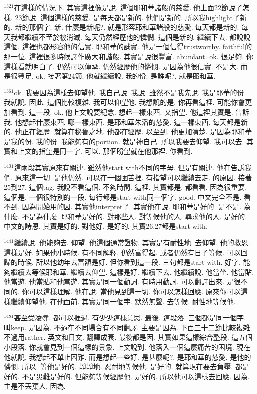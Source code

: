 \documentclass{book}
\begin{document}
$^{1321}$在這樣的情況下.
其實這裡像是說.
這個耶和華諸般的慈愛.
他上面22節說了怎樣.
23節說.
這個這樣的慈愛.
是每天都是新的.
他們是新的.
所以我highlight了新的.
新的那個字.
新.
什麼是新呢?.
就是形容耶和華諸般的慈愛.
每天都是新的.
每天我都繼續不至於被消滅.
每天仍然經歷他的憐憫.
這個是新的.
繼續下去.
都說說這個.
這裡也都形容他的信實.
耶和華的誠實.
他是一個信得trustworthy.
faithful的那一位.
這裡很多時候譯作廣大和諧般.
其實是說很豐富.
abundant.
ok.
很足夠.
你這樣看就明白了.
仍然可以傳承.
仍然經歷他的憐憫.
是因為他很信實.
不是大.
而是很豐足.
ok.
接著第24節.
他就繼續說.
我的份.
是誰呢?.
就是耶和華.

$^{1361}$ok.
我要因為這樣去仰望他.
我自己說.
我說.
雖然不是我先說.
我是耶華的份.
我就說.
因此.
這個比較複雜.
我可以仰望他.
我想說的是.
你再看這裡.
可能你會更加看到.
這一段.
ok.
他上文說要紀念.
想起一樣東西.
又指望.
他這裡其實是.
告訴我.
他想起什麼東西.
哪一樣東西.
是耶和華朱潘的慈愛.
這一樣東西.
每天都是新的.
他正在經歷.
就算在秘魯之地.
他都在經歷.
以至到.
他更加清楚.
是因為耶和華是我的份.
我的份.
我能夠有的portion.
就是神自己.
所以我要去仰望.
我可以去.
其實和上文的指望是同一字.
可以.
那個盼望就在他那裡.
你看到.

$^{1401}$這兩段其實原來有關連.
雖然他start with不同的字母.
但是有關連.
他在告訴我們.
原來這一切.
是他仍然.
可以在一個困苦裡.
有指望可以繼續去走.
的原因.
接著25到27.
這個tag.
我說不看這個.
不夠時間.
這裡.
其實都是.
都看看.
因為很重要.
這個是.
一個很特別的一段.
每行都是start with同一個字.
good.
中文完全不是.
看不到.
因為開始用的因.
其實他interpret了.
其實他在說.
耶和華是好的.
是不是.
為什麼.
不是為什麼.
耶和華是好的.
對那些人.
對等候他的人.
尋求他的人.
是好的.
中文的詩恩.
其實是好的.
對他好.
是好的.
其實26,27都是start with.

$^{1441}$繼續說.
他能夠去.
仰望.
他這個通常證物.
其實是有耐性地.
去仰望.
他的救恩.
這樣是好.
如果他小時候.
有不同解釋.
仍然富得起.
或者仍然有日子等候.
可以回歸的時候.
所以他幼年去富額是好.
但你看到這一段.
三句都是start with.
好字.
能夠繼續去等候耶和華.
繼續去仰望.
這樣是好.
繼續下去.
他繼續說.
他當坐.
他當貼.
他當遊.
他當貼和他當遊.
其實是同一個動詞.
有時用動詞.
可以翻譯出來.
是很不同的.
你可以這樣理解.
他在說.
當他見到這一切.
你可以怎樣回應.
原來你可以這樣繼續仰望他.
在他面前.
其實是同一個字.
默然無聲.
去等候.
耐性地等候他.

$^{1481}$甚至受凌辱.
都可以捱過.
有少少這樣意思.
最後.
這段落.
三個都是同一個字.
叫keep.
是因為.
不過在不同場合有不同翻譯.
主要是因為.
下面三十二節比較複雜.
不過用rather.
英文和日文.
翻譯成衰.
最後都是因.
其實如果這樣綜合整段.
這五個小段落.
你就會見到一個這樣的景象.
上文說到.
他落入一個這麼痛苦的困境.
現在他就說.
我想起不單止困難.
而是想起一些好.
是甚麼呢?.
是耶和華的慈愛.
是他的憐憫.
所以.
等他是好的.
靜靜地.
忍耐地等候他.
是好的.
就算現在要去負壓.
都是好的.
不是災難是好的.
但能夠等候經歷他.
是好的.
所以他可以這樣去回應.
因為.
主是不丟棄人.
因為.
\end{document}
